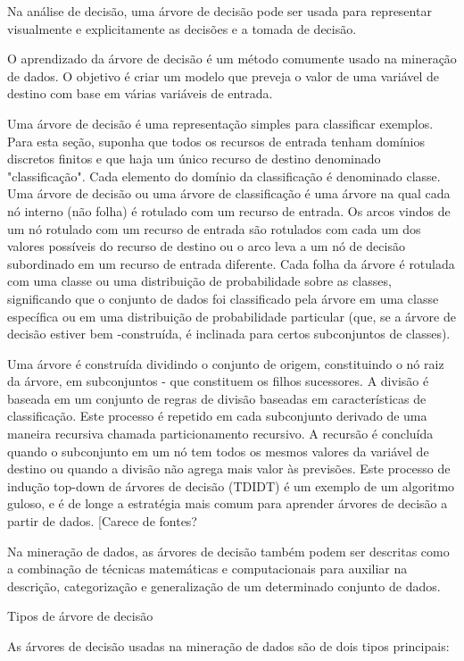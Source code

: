 \documentclass{article}
\begin{document}
Na análise de decisão, uma árvore de decisão pode ser usada para representar visualmente e explicitamente as decisões e a tomada de decisão.

O aprendizado da árvore de decisão é um método comumente usado na mineração de dados. O objetivo é criar um modelo que preveja o valor de uma variável de destino com base em várias variáveis de entrada.

Uma árvore de decisão é uma representação simples para classificar exemplos. Para esta seção, suponha que todos os recursos de entrada tenham domínios discretos finitos e que haja um único recurso de destino denominado "classificação". Cada elemento do domínio da classificação é denominado classe. Uma árvore de decisão ou uma árvore de classificação é uma árvore na qual cada nó interno (não folha) é rotulado com um recurso de entrada. Os arcos vindos de um nó rotulado com um recurso de entrada são rotulados com cada um dos valores possíveis do recurso de destino ou o arco leva a um nó de decisão subordinado em um recurso de entrada diferente. Cada folha da árvore é rotulada com uma classe ou uma distribuição de probabilidade sobre as classes, significando que o conjunto de dados foi classificado pela árvore em uma classe específica ou em uma distribuição de probabilidade particular (que, se a árvore de decisão estiver bem -construída, é inclinada para certos subconjuntos de classes).

Uma árvore é construída dividindo o conjunto de origem, constituindo o nó raiz da árvore, em subconjuntos - que constituem os filhos sucessores. A divisão é baseada em um conjunto de regras de divisão baseadas em características de classificação. Este processo é repetido em cada subconjunto derivado de uma maneira recursiva chamada particionamento recursivo. A recursão é concluída quando o subconjunto em um nó tem todos os mesmos valores da variável de destino ou quando a divisão não agrega mais valor às previsões. Este processo de indução top-down de árvores de decisão (TDIDT) é um exemplo de um algoritmo guloso, e é de longe a estratégia mais comum para aprender árvores de decisão a partir de dados. [Carece de fontes?

Na mineração de dados, as árvores de decisão também podem ser descritas como a combinação de técnicas matemáticas e computacionais para auxiliar na descrição, categorização e generalização de um determinado conjunto de dados.

Tipos de árvore de decisão

As árvores de decisão usadas na mineração de dados são de dois tipos principais:
\end{document}
